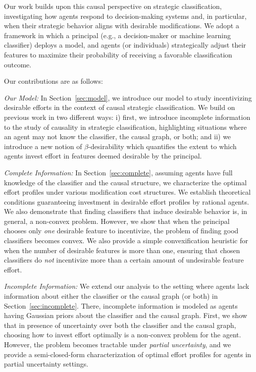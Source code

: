 Our work builds upon this causal perspective on strategic classification, investigating how agents respond to decision-making systems and, in particular, when their strategic behavior aligns with desirable modifications. We adopt a framework in which a principal (e.g., a decision-maker or machine learning classifier) deploys a model, and agents (or individuals) strategically adjust their features to maximize their probability of receiving a favorable classification outcome. 

\vspace{5pt}

 Our contributions are as follows: 

\emph{Our Model:}  In Section~\ref{sec:model}, we introduce our model to study incentivizing desirable efforts in the context of causal strategic classification. We build on previous work in two different ways: i) first, we introduce incomplete information to the study of causality in strategic classification, highlighting situations where an agent may not know the classifier, the causal graph, or both; and ii) we introduce a new notion of $\beta$-desirability which quantifies the extent to which agents invest effort in features deemed desirable by the principal.

\emph{Complete Information:}  In Section~\ref{sec:complete}, assuming agents have full knowledge of the classifier and the causal structure, we characterize the optimal effort profiles under various modification cost structures. We establish theoretical conditions guaranteeing investment in desirable effort profiles by rational agents. We also demonstrate that finding classifiers that induce desirable behavior is, in general, a non-convex problem.  
However, we show that when the principal chooses only \emph{one} desirable feature to incentivize, the problem of finding good classifiers becomes convex. We also provide a simple convexification heuristic  for when the number of desirable features is more than one,  ensuring that chosen classifiers do \emph{not} incentivize more than a certain amount of undesirable feature effort.

\emph{Incomplete Information:}  We extend our analysis to the setting where agents lack information about either the classifier or the causal graph (or both) in Section~\ref{sec:incomplete}. There, incomplete information is modeled as agents having Gaussian priors about the classifier and the causal graph. First, we show that in presence of uncertainty over both the classifier and the causal graph, choosing how to invest effort optimally is a non-convex problem for the agent. However, the problem becomes tractable under \emph{partial uncertainty}, and we provide a semi-closed-form characterization of optimal effort profiles for agents in partial uncertainty settings. %

